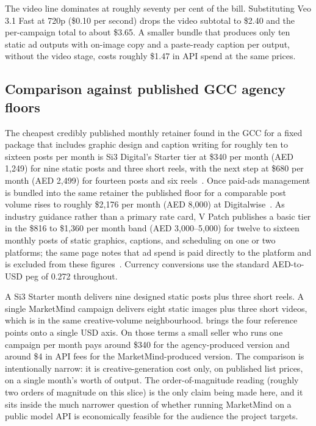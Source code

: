 \documentclass[12pt,a4paper]{report}
\begin{document}
The video line dominates at roughly seventy per cent of the bill. Substituting Veo 3.1 Fast at 720p (\$0.10 per second) drops the video subtotal to \$2.40 and the per-campaign total to about \$3.65. A smaller bundle that produces only ten static ad outputs with on-image copy and a paste-ready caption per output, without the video stage, costs roughly \$1.47 in API spend at the same prices.

\subsection*{Comparison against published GCC agency floors}

The cheapest credibly published monthly retainer found in the GCC for a fixed package that includes graphic design and caption writing for roughly ten to sixteen posts per month is Si3 Digital's Starter tier at \$340 per month (AED 1,249) for nine static posts and three short reels, with the next step at \$680 per month (AED 2,499) for fourteen posts and six reels~\cite{si3packages}. Once paid-ads management is bundled into the same retainer the published floor for a comparable post volume rises to roughly \$2,176 per month (AED 8,000) at Digitalwise~\cite{digitalwisepackages}. As industry guidance rather than a primary rate card, V Patch publishes a basic tier in the \$816 to \$1,360 per month band (AED 3,000--5,000) for twelve to sixteen monthly posts of static graphics, captions, and scheduling on one or two platforms; the same page notes that ad spend is paid directly to the platform and is excluded from these figures~\cite{vpatchpricing}. Currency conversions use the standard AED-to-USD peg of 0.272 throughout.

A Si3 Starter month delivers nine designed static posts plus three short reels. A single MarketMind campaign delivers eight static images plus three short videos, which is in the same creative-volume neighbourhood.  brings the four reference points onto a single USD axis. On those terms a small seller who runs one campaign per month pays around \$340 for the agency-produced version and around \$4 in API fees for the MarketMind-produced version. The comparison is intentionally narrow: it is creative-generation cost only, on published list prices, on a single month's worth of output. The order-of-magnitude reading (roughly two orders of magnitude on this slice) is the only claim being made here, and it sits inside the much narrower question of whether running MarketMind on a public model API is economically feasible for the audience the project targets.
\end{document}
